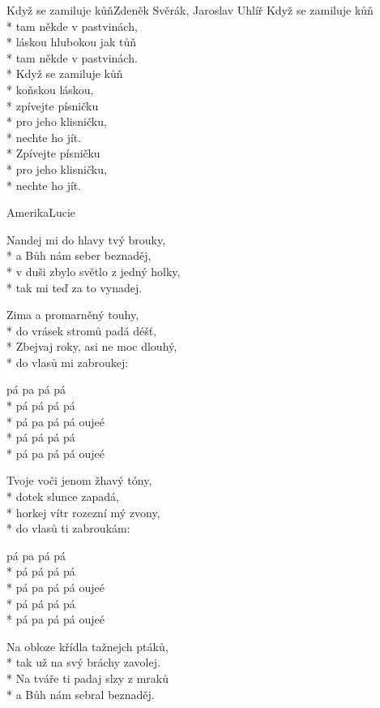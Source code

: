 \documentclass[10.5pt]{book}
\begin{document}
\begin{poem}{Když se zamiluje kůň}{Zdeněk Svěrák, Jaroslav Uhlíř}
Když se zamiluje kůň\\*
tam někde v pastvinách,\\*
láskou hlubokou jak tůň\\*
tam někde v pastvinách.\\*
Když se zamiluje kůň\\*
koňskou láskou,\\*
zpívejte písničku\\*
pro jeho klisničku,\\*
nechte ho jít.\\*
Zpívejte písničku\\*
pro jeho klisničku,\\*
nechte ho jít.

\end{poem}

\begin{poem}{Amerika}{Lucie}

\settowidth{\versewidth}{v duši zbylo světlo z jedný holky,}

Nandej mi do hlavy tvý brouky,\\*
a Bůh nám seber beznaděj,\\*
v duši zbylo světlo z jedný holky,\\*
tak mi teď za to vynadej.

Zima a promarněný touhy,\\*
do vrásek stromů padá déšť,\\*
Zbejvaj roky, asi ne moc dlouhý,\\*
do vlasů mi zabroukej:

pá pa pá pá\\*
pá pá pá pá\\*
pá pa pá pá oujeé\\*
pá pá pá pá\\*
pá pa pá pá oujeé

Tvoje voči jenom žhavý tóny,\\*
dotek slunce zapadá,\\*
horkej vítr rozezní mý zvony,\\*
do vlasů ti zabroukám:

pá pa pá pá\\*
pá pá pá pá\\*
pá pa pá pá oujeé\\*
pá pá pá pá\\*
pá pa pá pá oujeé

Na obloze křídla tažnejch ptáků,\\*
tak už na svý bráchy zavolej.\\*
Na tváře ti padaj slzy z mraků\\*
a Bůh nám sebral beznaděj. 


\end{poem}
\end{document}
